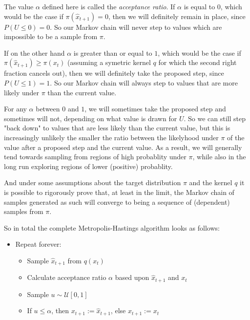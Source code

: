 The value $\alpha$ defined here is called the \textit{acceptance ratio}. If $\alpha$ is equal to $0$, which would be the case if $\pi(\hat{x}_{t+1}) = 0$, then we will definitely remain in place, since $P(U \le 0) = 0$. So our Markov chain will never step to values which are impossible to be a sample from $\pi$.

If on the other hand $\alpha$ is greater than or equal to $1$, which would be the case if $\pi(\hat{x}_{t+1}) \ge {\pi(x_t)}$ (assuming a symetric kernel $q$ for which the second right fraction cancels out), then we will definitely take the proposed step, since $P(U \le 1) = 1$. So our Markov chain will always step to values that are more likely under $\pi$ than the current value.

For any $\alpha$ between $0$ and $1$, we will sometimes take the proposed step and sometimes will not, depending on what value is drawn for $U$. So we can still step "back down" to values that are less likely than the current value, but this is increasingly unlikely the smaller the ratio between the likelyhood under $\pi$ of the value after a proposed step and the current value. As a result, we will generally tend towards sampling from regions of high probablity under $\pi$, while also in the long run exploring regions of lower (positive) probablity.

And under some assumptions about the target distribution $\pi$ and the kernel $q$ it is possible to rigorously prove that, at least in the limit, the Markov chain of samples generated as such will converge to being a sequence of (dependent) samples from $\pi$.

So in total the complete Metropolis-Hastings algorithm looks as follows:

\begin{minipage}{\linewidth}
\begin{itemize}
\item Repeat forever:
  \begin{itemize}
    \item Sample $\hat{x}_{t+1}$ from $q(x_t)$
    \item Calculate acceptance ratio $\alpha$ based upon $\hat{x}_{t+1}$ and $x_t$
    \item Sample $u \sim \mathcal{U}[0,1]$
    \item If $u \le \alpha$, then $x_{t+1} := \hat{x}_{t+1}$, else $x_{t+1} := x_t$
  \end{itemize}
\end{itemize}
\end{minipage}

